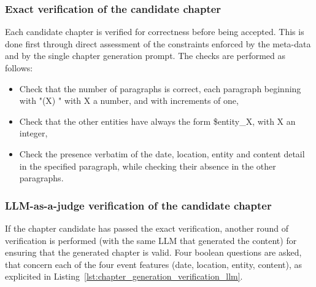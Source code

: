 \documentclass{article}
\begin{document}
\subsubsection{Exact verification of the candidate chapter}\label{sec:verif_direct}

Each candidate chapter is verified for correctness before being accepted. This is done first through direct assessment of the constraints enforced by the meta-data and by the single chapter generation prompt. The checks are performed as follows:
\begin{itemize}
\item Check that the number of paragraphs is correct, each paragraph beginning with "(X) " with X a number, and with increments of one,
\item Check that the other entities have always the form \$entity\_X, with X an integer, 
\item Check the presence verbatim of the date, location, entity and content detail in the specified paragraph, while checking their absence in the other paragraphs.
\end{itemize}

\subsubsection{LLM-as-a-judge verification of the candidate chapter}\label{sec:verif_llm}

If the chapter candidate has passed the exact verification, another round of verification is performed (with the same LLM that generated the content) for ensuring that the generated chapter is valid. Four boolean questions are asked, that concern each of the four event features (date, location, entity, content), as explicited in Listing~\ref{lst:chapter_generation_verification_llm}.
\end{document}
